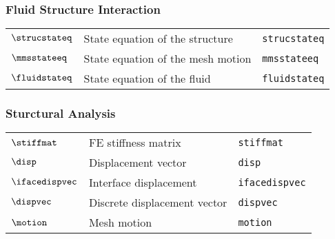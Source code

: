 \subsubsection*{Fluid Structure Interaction}
\begin{tabular}{l l l}
$\strucstateq$ & State equation of the structure& \texttt{strucstateq}\\
$\mmsstateeq$ & State equation of the mesh motion& \texttt{mmsstateeq}\\
$\fluidstateq$ & State equation of the fluid& \texttt{fluidstateq}\\
\end{tabular}

\subsubsection*{Sturctural Analysis}
\begin{tabular}{l l l}
$\stiffmat$ & \ac{FE} stiffness matrix& \texttt{stiffmat}\\
$\disp$ & Displacement vector& \texttt{disp}\\
$\ifacedispvec$ & Interface displacement& \texttt{ifacedispvec}\\
$\dispvec$ & Discrete displacement vector& \texttt{dispvec}\\
$\motion$ & Mesh motion& \texttt{motion}\\
\end{tabular}

